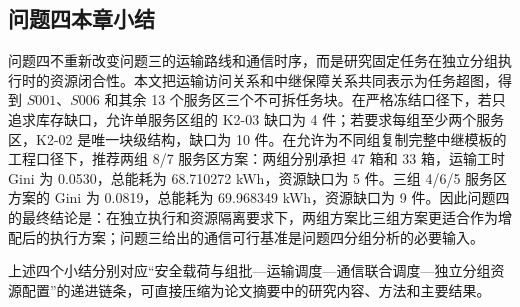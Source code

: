 \documentclass[UTF8,a4paper,12pt]{ctexart}
\begin{document}
\subsection{问题四本章小结}
问题四不重新改变问题三的运输路线和通信时序，而是研究固定任务在独立分组执行时的资源闭合性。本文把运输访问关系和中继保障关系共同表示为任务超图，得到 $S001$、$S006$ 和其余 13 个服务区三个不可拆任务块。在严格冻结口径下，若只追求库存缺口，允许单服务区组的 K2-03 缺口为 4 件；若要求每组至少两个服务区，K2-02 是唯一块级结构，缺口为 10 件。在允许为不同组复制完整中继模板的工程口径下，推荐两组 8/7 服务区方案：两组分别承担 47 箱和 33 箱，运输工时 Gini 为 0.0530，总能耗为 68.710272 kWh，资源缺口为 5 件。三组 4/6/5 服务区方案的 Gini 为 0.0819，总能耗为 69.968349 kWh，资源缺口为 9 件。因此问题四的最终结论是：在独立执行和资源隔离要求下，两组方案比三组方案更适合作为增配后的执行方案；问题三给出的通信可行基准是问题四分组分析的必要输入。

上述四个小结分别对应“安全载荷与组批—运输调度—通信联合调度—独立分组资源配置”的递进链条，可直接压缩为论文摘要中的研究内容、方法和主要结果。
\end{document}
